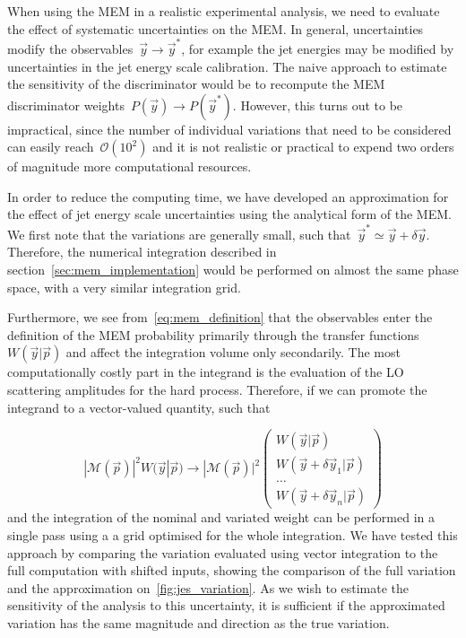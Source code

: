 When using the MEM in a realistic experimental analysis, we need to evaluate the effect of systematic uncertainties on the MEM. In general, uncertainties modify the observables~$\vec{y} \rightarrow \vec{y}^*$, for example the jet energies may be modified by uncertainties in the jet energy scale calibration. The naive approach to estimate the sensitivity of the discriminator would be to recompute the MEM discriminator weights~$P(\vec{y}) \rightarrow P(\vec{y}^*)$. However, this turns out to be impractical, since the number of individual variations that need to be considered can easily reach~$\mathcal{O}(10^2)$ and it is not realistic or practical to expend two orders of magnitude more computational resources.

In order to reduce the computing time, we have developed an approximation for the effect of jet energy scale uncertainties using the analytical form of the MEM. We first note that the variations are generally small, such that~$\vec{y}^* \simeq \vec{y} + \delta \vec{y}$. Therefore, the numerical integration described in section~\cref{sec:mem_implementation} would be performed on almost the same phase space, with a very similar integration grid.

Furthermore, we see from~\cref{eq:mem_definition} that the observables enter the definition of the MEM probability primarily through the transfer functions~$W(\vec{y} | \vec{p})$ and affect the integration volume only secondarily. The most computationally costly part in the integrand is the evaluation of the LO scattering amplitudes for the hard process. Therefore, if we can promote the integrand to a vector-valued quantity, such that

\begin{equation}
|\mathcal{M}(\vec{p})|^2 W(\vec{y} | \vec{p}) \rightarrow |\mathcal{M}(\vec{p})|^2  \begin{pmatrix}
  W(\vec{y} | \vec{p}) \\
  W(\vec{y} + \delta \vec{y}_1 | \vec{p}) \\
  \dots \\
  W(\vec{y} + \delta \vec{y}_n | \vec{p})
 \end{pmatrix}
\end{equation}
and the integration of the nominal and variated weight can be performed in a single pass using a a grid optimised for the whole integration. We have tested this approach by comparing the variation evaluated using vector integration to the full computation with shifted inputs, showing the comparison of the full variation and the approximation on~\cref{fig:jes_variation}. As we wish to estimate the sensitivity of the analysis to this uncertainty, it is sufficient if the approximated variation has the same magnitude and direction as the true variation.

